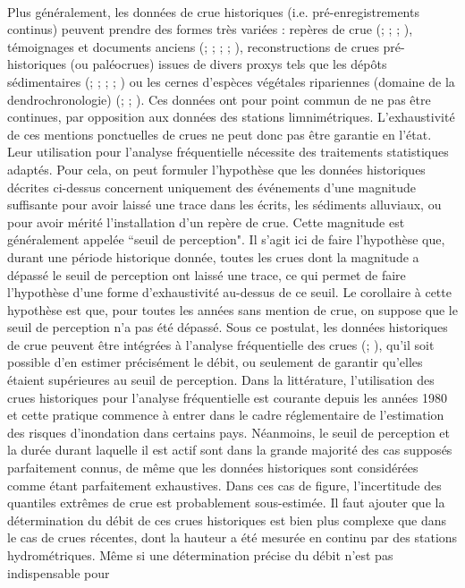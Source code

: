 	\paragraph{} Plus généralement, les données de crue historiques (i.e. pré-enregistrements continus) peuvent prendre des formes très variées : repères de crue (\cite{parkes_defining_2016}; \cite{piotte_collection_2016}; \cite{engeland_new_2020}; \cite{medd_reperes_2023}), témoignages et documents anciens (\cite{pichard_les_1995}; \cite{naulet_flood_2005}; \cite{neppel_flood_2010}; \cite{kjeldsen_documentary_2014}; \cite{macdonald_reassessing_2014}), reconstructions de crues pré-historiques (ou paléocrues) issues de divers proxys tels que les dépôts sédimentaires (\cite{baker_paleoflood_1987}; \cite{dezileau_multidating_2014}; \cite{engeland_new_2020}; \cite{corella_1400-years_2021}; \cite{wilhelm_reconstructing_2022}) ou les cernes d'espèces végétales ripariennes (domaine de la dendrochronologie) (\cite{martens_dendrochronological_1992}; \cite{loomans_flood_1993}; \cite{ballesteros-canovas_review_2015}). Ces données ont pour point commun de ne pas être continues, par opposition aux données des stations limnimétriques. L'exhaustivité de ces mentions ponctuelles de crues ne peut donc pas être garantie en l'état. Leur utilisation pour l'analyse fréquentielle nécessite des traitements statistiques adaptés. Pour cela, on peut formuler l'hypothèse que les données historiques décrites ci-dessus concernent uniquement des événements d'une magnitude suffisante pour avoir laissé une trace dans les écrits, les sédiments alluviaux, ou pour avoir mérité l'installation d'un repère de crue. Cette magnitude est généralement appelée ``seuil de perception". Il s'agit ici de faire l'hypothèse que, durant une période historique donnée, toutes les crues dont la magnitude a dépassé le seuil de perception ont laissé une trace, ce qui permet de faire l'hypothèse d'une forme d'exhaustivité au-dessus de ce seuil. Le corollaire à cette hypothèse est que, pour toutes les années sans mention de crue, on suppose que le seuil de perception n'a pas été dépassé. Sous ce postulat, les données historiques de crue peuvent être intégrées à l'analyse fréquentielle des crues (\cite{gerard_probability_1979}; \cite{stedinger_flood_1986}), qu'il soit possible d'en estimer précisément le débit, ou seulement de garantir qu'elles étaient supérieures au seuil de perception. Dans la littérature, l'utilisation des crues historiques pour l'analyse fréquentielle est courante depuis les années 1980 et cette pratique commence à entrer dans le cadre réglementaire de l'estimation des risques d'inondation dans certains pays. Néanmoins, le seuil de perception et la durée durant laquelle il est actif sont dans la grande majorité des cas supposés parfaitement connus, de même que les données historiques sont considérées comme étant parfaitement exhaustives. Dans ces cas de figure, l'incertitude  des quantiles extrêmes de crue est probablement sous-estimée. Il faut ajouter que la détermination du débit de ces crues historiques est bien plus complexe que dans le cas de crues récentes, dont la hauteur a été mesurée en continu par des stations hydrométriques. Même si une détermination précise du débit n'est pas indispensable pour 